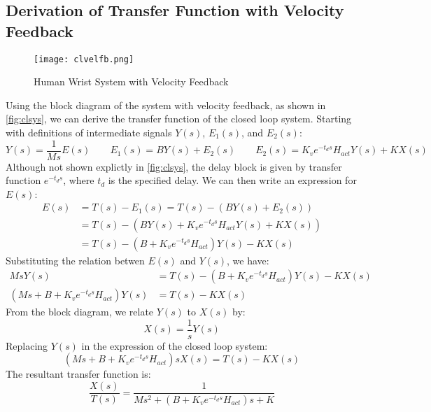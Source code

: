 \documentclass[11pt,a4paper]{article}
\begin{document}
\subsection{Derivation of Transfer Function with Velocity Feedback}
\begin{figure}
    \centering
    \texttt{[image: clvelfb.png]}
    \caption{Human Wrist System with Velocity Feedback}
    \label{fig:clsys}
\end{figure}
Using the block diagram of the system with velocity feedback, as shown in
\autoref{fig:clsys}, we can derive the transfer function of the closed loop
system. Starting with definitions of intermediate signals $Y(s)$, $E_1(s)$, and
$E_2(s)$:
\begin{equation*}
    Y(s) = \frac{1}{Ms}E(s) \qquad E_1(s) = BY(s) + E_2(s) \qquad
    E_2(s) = K_v e^{-t_d s} H_{act} Y(s) + KX(s)
\end{equation*}
Although not shown explictly in \autoref{fig:clsys}, the delay block is given
by transfer function $ e^{-t_d s} $, where $t_d$ is the specified delay. We can
then write an expression for $E(s)$:
\begin{align*}
    E(s) &= T(s) - E_1(s) = T(s) - (BY(s) + E_2(s)) \\
         &= T(s) - (BY(s) + K_v e^{-t_d s} H_{act} Y(s) + KX(s)) \\
         &= T(s) - (B + K_v e^{-t_d s} H_{act}) Y(s) - KX(s)
\end{align*}
Substituting the relation betwen $E(s)$ and $Y(s)$, we have:
\begin{align*}
    Ms Y(s) &= T(s) - (B + K_v e^{-t_d s} H_{act}) Y(s) - KX(s) \\
    (Ms + B + K_v e^{-t_d s} H_{act}) Y(s) &= T(s) - KX(s)
\end{align*}
From the block diagram, we relate $Y(s)$ to $X(s)$ by:
\begin{equation*}
    X(s) = \frac{1}{s} Y(s)
\end{equation*}
Replacing $Y(s)$ in the expression of the closed loop system:
\begin{equation*}
    (Ms + B + K_v e^{-t_d s} H_{act}) s X(s) = T(s) - KX(s)
\end{equation*}
The resultant transfer function is:
\begin{equation*}
    \frac{X(s)}{T(s)} = \frac{1}{Ms^2 + (B + K_v e^{-t_d s} H_{act}) s  + K}
\end{equation*}

\end{document}
